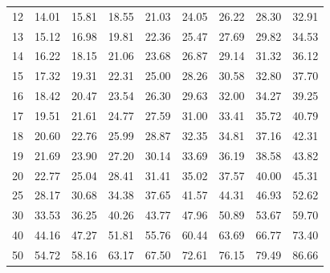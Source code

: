 \begin{center}
\begin{tabular}{r | rrrr | rrrr |}
  12 & \footnotesize 14.01 & \footnotesize 15.81 & \footnotesize 18.55 & \footnotesize 21.03 & \footnotesize 24.05 & \footnotesize 26.22 & \footnotesize 28.30 & \footnotesize 32.91 \\ 
  13 & \footnotesize 15.12 & \footnotesize 16.98 & \footnotesize 19.81 & \footnotesize 22.36 & \footnotesize 25.47 & \footnotesize 27.69 & \footnotesize 29.82 & \footnotesize 34.53 \\ 
  14 & \footnotesize 16.22 & \footnotesize 18.15 & \footnotesize 21.06 & \footnotesize 23.68 & \footnotesize 26.87 & \footnotesize 29.14 & \footnotesize 31.32 & \footnotesize 36.12 \\ 
  15 & \footnotesize 17.32 & \footnotesize 19.31 & \footnotesize 22.31 & \footnotesize 25.00 & \footnotesize 28.26 & \footnotesize 30.58 & \footnotesize 32.80 & \footnotesize 37.70 \\ 
  \hline
  16 & \footnotesize 18.42 & \footnotesize 20.47 & \footnotesize 23.54 & \footnotesize 26.30 & \footnotesize 29.63 & \footnotesize 32.00 & \footnotesize 34.27 & \footnotesize 39.25 \\ 
  17 & \footnotesize 19.51 & \footnotesize 21.61 & \footnotesize 24.77 & \footnotesize 27.59 & \footnotesize 31.00 & \footnotesize 33.41 & \footnotesize 35.72 & \footnotesize 40.79 \\ 
  18 & \footnotesize 20.60 & \footnotesize 22.76 & \footnotesize 25.99 & \footnotesize 28.87 & \footnotesize 32.35 & \footnotesize 34.81 & \footnotesize 37.16 & \footnotesize 42.31 \\ 
  19 & \footnotesize 21.69 & \footnotesize 23.90 & \footnotesize 27.20 & \footnotesize 30.14 & \footnotesize 33.69 & \footnotesize 36.19 & \footnotesize 38.58 & \footnotesize 43.82 \\ 
  20 & \footnotesize 22.77 & \footnotesize 25.04 & \footnotesize 28.41 & \footnotesize 31.41 & \footnotesize 35.02 & \footnotesize 37.57 & \footnotesize 40.00 & \footnotesize 45.31 \\ 
  \hline
  25 & \footnotesize 28.17 & \footnotesize 30.68 & \footnotesize 34.38 & \footnotesize 37.65 & \footnotesize 41.57 & \footnotesize 44.31 & \footnotesize 46.93 & \footnotesize 52.62 \\ 
  30 & \footnotesize 33.53 & \footnotesize 36.25 & \footnotesize 40.26 & \footnotesize 43.77 & \footnotesize 47.96 & \footnotesize 50.89 & \footnotesize 53.67 & \footnotesize 59.70 \\ 
  40 & \footnotesize 44.16 & \footnotesize 47.27 & \footnotesize 51.81 & \footnotesize 55.76 & \footnotesize 60.44 & \footnotesize 63.69 & \footnotesize 66.77 & \footnotesize 73.40 \\ 
  50 & \footnotesize 54.72 & \footnotesize 58.16 & \footnotesize 63.17 & \footnotesize 67.50 & \footnotesize 72.61 & \footnotesize 76.15 & \footnotesize 79.49 & \footnotesize 86.66 \\ 
  \hline
\end{tabular}
\end{center}

